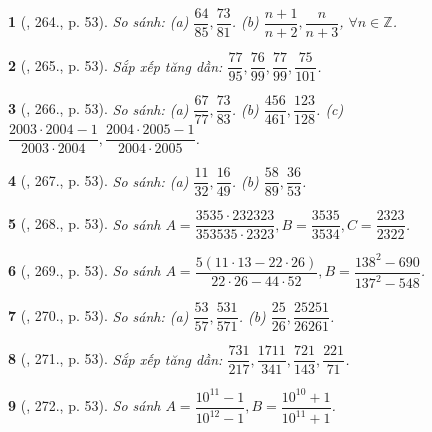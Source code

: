 \documentclass{article}
\newtheorem{baitoan}{}
\begin{document}
\begin{baitoan}[\cite{Tuyen_Toan_6}, 264., p. 53]
	So sánh: (a) $\dfrac{64}{85},\dfrac{73}{81}$. (b) $\dfrac{n + 1}{n + 2},\dfrac{n}{n + 3}$, $\forall n\in\mathbb{Z}$.
\end{baitoan}

\begin{baitoan}[\cite{Tuyen_Toan_6}, 265., p. 53]
	Sắp xếp tăng dần: $\dfrac{77}{95},\dfrac{76}{99},\dfrac{77}{99},\dfrac{75}{101}$.
\end{baitoan}

\begin{baitoan}[\cite{Tuyen_Toan_6}, 266., p. 53]
	So sánh: (a) $\dfrac{67}{77},\dfrac{73}{83}$. (b) $\dfrac{456}{461},\dfrac{123}{128}$. (c) $\dfrac{2003\cdot2004 - 1}{2003\cdot2004},\dfrac{2004\cdot2005 - 1}{2004\cdot2005}$.
\end{baitoan}

\begin{baitoan}[\cite{Tuyen_Toan_6}, 267., p. 53]
	So sánh: (a) $\dfrac{11}{32},\dfrac{16}{49}$. (b) $\dfrac{58}{89},\dfrac{36}{53}$.
\end{baitoan}

\begin{baitoan}[\cite{Tuyen_Toan_6}, 268., p. 53]
	So sánh $A = \dfrac{3535\cdot232323}{353535\cdot2323},B = \dfrac{3535}{3534},C = \dfrac{2323}{2322}$.
\end{baitoan}

\begin{baitoan}[\cite{Tuyen_Toan_6}, 269., p. 53]
	So sánh $A = \dfrac{5(11\cdot13 - 22\cdot26)}{22\cdot26 - 44\cdot52},B = \dfrac{138^2 - 690}{137^2 - 548}$.
\end{baitoan}

\begin{baitoan}[\cite{Tuyen_Toan_6}, 270., p. 53]
	So sánh: (a) $\dfrac{53}{57},\dfrac{531}{571}$. (b) $\dfrac{25}{26},\dfrac{25251}{26261}$.
\end{baitoan}

\begin{baitoan}[\cite{Tuyen_Toan_6}, 271., p. 53]
	Sắp xếp tăng dần: $\dfrac{731}{217},\dfrac{1711}{341},\dfrac{721}{143},\dfrac{221}{71}$.
\end{baitoan}

\begin{baitoan}[\cite{Tuyen_Toan_6}, 272., p. 53]
	So sánh $A = \dfrac{10^{11} - 1}{10^{12} - 1},B = \dfrac{10^{10} + 1}{10^{11} + 1}$.
\end{baitoan}
\end{document}
